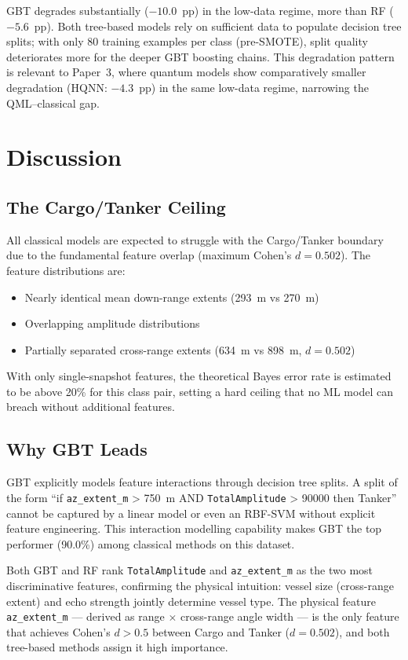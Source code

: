 \documentclass[journal]{IEEEtran}
\begin{document}
\noindent GBT degrades substantially ($-10.0$~pp) in the low-data regime,
more than RF ($-5.6$~pp). Both tree-based models rely on sufficient
data to populate decision tree splits; with only 80 training examples per class
(pre-SMOTE), split quality deteriorates more for the deeper GBT boosting chains.
This degradation pattern is relevant to Paper~3, where quantum models show
comparatively smaller degradation (HQNN: $-4.3$~pp) in the same low-data
regime, narrowing the QML--classical gap.

\section{Discussion}
\label{sec:discussion}

\subsection{The Cargo/Tanker Ceiling}

All classical models are expected to struggle with the Cargo/Tanker boundary
due to the fundamental feature overlap (maximum Cohen's $d = 0.502$).
The feature distributions are:
\begin{itemize}
  \item Nearly identical mean down-range extents (293~m vs 270~m)
  \item Overlapping amplitude distributions
  \item Partially separated cross-range extents (634~m vs 898~m, $d=0.502$)
\end{itemize}
With only single-snapshot features, the theoretical Bayes error rate is
estimated to be above 20\% for this class pair, setting a hard ceiling that
no ML model can breach without additional features.

\subsection{Why GBT Leads}

GBT explicitly models feature interactions through decision tree splits.
A split of the form ``if \texttt{az\_extent\_m} > 750~m AND
\texttt{TotalAmplitude} > 90000 then Tanker'' cannot be captured by
a linear model or even an RBF-SVM without explicit feature engineering.
This interaction modelling capability makes GBT the top performer (90.0\%)
among classical methods on this dataset.

Both GBT and RF rank \texttt{TotalAmplitude} and \texttt{az\_extent\_m}
as the two most discriminative features, confirming the physical intuition:
vessel size (cross-range extent) and echo strength jointly determine vessel type.
The physical feature \texttt{az\_extent\_m} — derived as range $\times$
cross-range angle width — is the only feature that achieves Cohen's $d > 0.5$
between Cargo and Tanker ($d = 0.502$), and both tree-based methods assign it
high importance.
\end{document}
